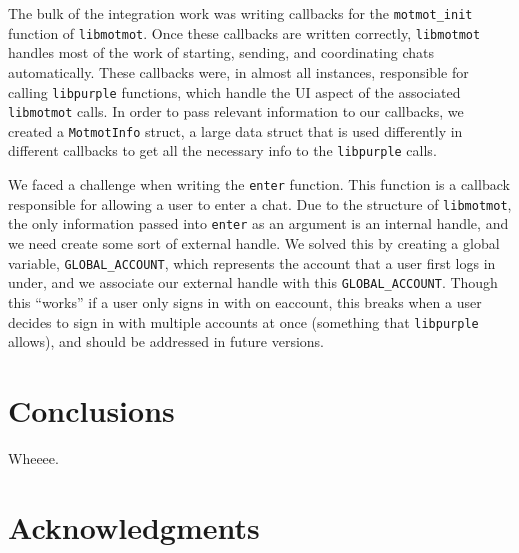 \documentclass{sig-alternate}
\newcommand\libmotmot{\texttt{libmotmot}\xspace}
\newcommand\libpurple{\texttt{libpurple}\xspace}
\begin{document}
The bulk of the integration work was writing callbacks for the
\verb`motmot_init` function of \libmotmot.  Once these callbacks are written
correctly, \libmotmot handles most of the work of starting, sending, and
coordinating chats automatically.  These callbacks were, in almost all
instances, responsible for calling \libpurple functions, which handle the UI
aspect of the associated \libmotmot calls.  In order to pass relevant
information to our callbacks, we created a \verb`MotmotInfo` struct, a large
data struct that is used differently in different callbacks to get all the
necessary info to the \libpurple calls.

We faced a challenge when writing the \verb`enter` function.  This function is a
callback responsible for allowing a user to enter a chat.  Due to the structure
of \libmotmot, the only information passed into \verb`enter` as an argument is
an internal handle, and we need create some sort of external handle.  We solved
this by creating a global variable, \verb`GLOBAL_ACCOUNT`, which represents the
account that a user first logs in under, and we associate our external handle
with this \verb`GLOBAL_ACCOUNT`.  Though this ``works'' if a user only signs in
with on eaccount, this breaks when a user decides to sign in with multiple
accounts at once (something that \libpurple allows), and should be addressed in
future versions.

\section{Conclusions}

Wheeee.

\section{Acknowledgments}

\end{document}
